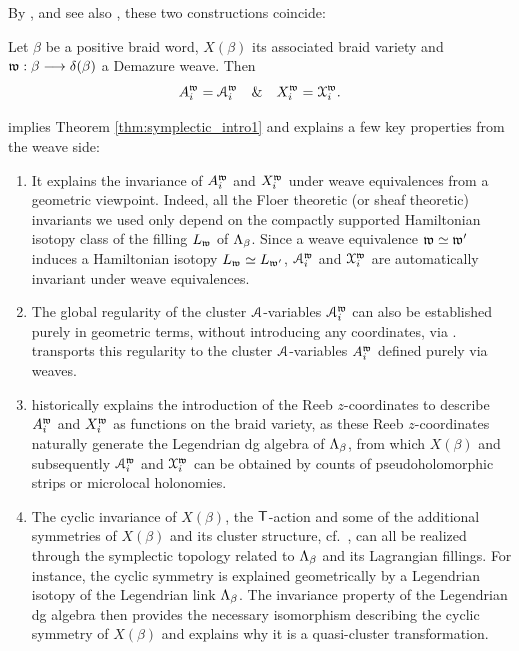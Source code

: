 \noindent By \cite[Section 4]{CasalsWeng22}, and see also \cite[Section 7.2.1]{CasalsZaslow}, these two constructions coincide:

\begin{theorem}\label{thm:comparison}
Let $\beta$ be a positive braid word, $X(\beta)$ its associated braid variety and $\mathfrak{w}:\beta\longrightarrow\delta(\beta)$ a Demazure weave. Then
$$A_i^{\mathfrak{w}}=\mathcal{A}_i^{\mathfrak{w}}\quad\&\quad X_i^{\mathfrak{w}}=\mathcal{X}_i^{\mathfrak{w}}.$$
\sbs
\end{theorem}

\noindent{} implies Theorem \ref{thm:symplectic_intro1} and explains a few key properties from the weave side:

\begin{enumerate}
    \item It explains the invariance of $A_i^{\mathfrak{w}}$ and $X_i^{\mathfrak{w}}$ under weave equivalences from a geometric viewpoint. Indeed, all the Floer theoretic (or sheaf theoretic) invariants we used only depend on the compactly supported Hamiltonian isotopy class of the filling $L_{\mathfrak{w}}$ of $\Lambda_\beta$. Since a weave equivalence $\mathfrak{w}\simeq\mathfrak{w}'$ induces a Hamiltonian isotopy $L_{\mathfrak{w}}\simeq L_{\mathfrak{w}'}$, $\mathcal{A}_i^{\mathfrak{w}}$ and $\mathcal{X}_i^{\mathfrak{w}}$ are automatically invariant under weave equivalences.\\

    \item The global regularity of the cluster $\mathcal{A}$-variables $\mathcal{A}_i^{\mathfrak{w}}$ can also be established purely in geometric terms, without introducing any coordinates, via \cite[Theorem 1.1]{CasalsLi24}.  transports this regularity to the cluster $\mathcal{A}$-variables $A_i^{\mathfrak{w}}$ defined purely via weaves.\\

    \item {} historically explains the introduction of the Reeb $z$-coordinates to describe $A_i^{\mathfrak{w}}$ and $X_i^{\mathfrak{w}}$ as functions on the braid variety, as these Reeb $z$-coordinates naturally generate the Legendrian dg algebra of $\Lambda_\beta$, from which $X(\beta)$ and subsequently $\mathcal{A}_i^{\mathfrak{w}}$ and $\mathcal{X}_i^{\mathfrak{w}}$ can be obtained by counts of pseudoholomorphic strips or microlocal holonomies.\\

    \item The cyclic invariance of $X(\beta)$, the $\mathsf{T}$-action and some of the additional symmetries of $X(\beta)$ and its cluster structure, cf.~, can all be realized through the symplectic topology related to $\Lambda_\beta$ and its Lagrangian fillings. For instance, the cyclic symmetry is explained geometrically by a Legendrian isotopy of the Legendrian link $\Lambda_\beta$. The invariance property of the Legendrian dg algebra then provides the necessary isomorphism describing the cyclic symmetry of $X(\beta)$ and explains why it is a quasi-cluster transformation.\\
\end{enumerate}
 


